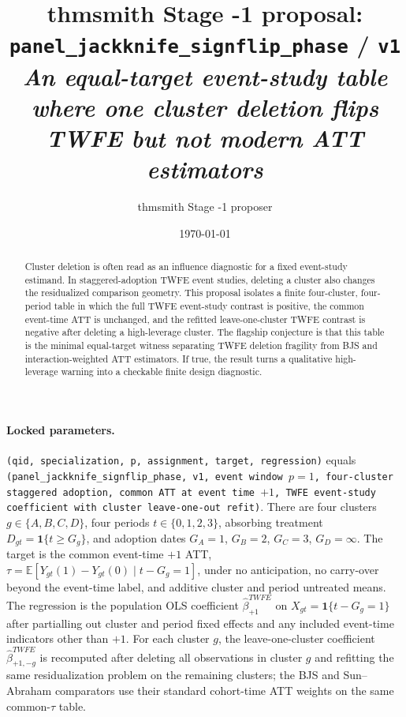 \documentclass[11pt]{article}
\title{thmsmith Stage -1 proposal: \texttt{panel\_jackknife\_signflip\_phase} / \texttt{v1}%
  \\ \large\textit{An equal-target event-study table where one cluster deletion flips TWFE but not modern ATT estimators}}
\author{thmsmith Stage -1 proposer}
\date{\today}
\newcommand{\E}{\mathbb{E}}
\newcommand{\one}{\mathbf{1}}
\theoremstyle{definition}
\theoremstyle{plain}
\theoremstyle{remark}
\begin{document}
\maketitle


\paragraph{Locked parameters.}
\texttt{(qid, specialization, p, assignment, target, regression)}
equals \texttt{(panel\_jackknife\_signflip\_phase, v1, event window \(p=1\), four-cluster staggered adoption, common ATT at event time \(+1\), TWFE event-study coefficient with cluster leave-one-out refit)}.  There are four clusters \(g\in\{A,B,C,D\}\), four periods \(t\in\{0,1,2,3\}\), absorbing treatment \(D_{gt}=\one\{t\ge G_g\}\), and adoption dates \(G_A=1\), \(G_B=2\), \(G_C=3\), \(G_D=\infty\).  The target is the common event-time \(+1\) ATT, \(\tau=\E[Y_{gt}(1)-Y_{gt}(0)\mid t-G_g=1]\), under no anticipation, no carry-over beyond the event-time label, and additive cluster and period untreated means.  The regression is the population OLS coefficient \(\hat\beta^{TWFE}_{+1}\) on \(X_{gt}=\one\{t-G_g=1\}\) after partialling out cluster and period fixed effects and any included event-time indicators other than \(+1\).  For each cluster \(g\), the leave-one-cluster coefficient \(\hat\beta^{TWFE}_{+1,-g}\) is recomputed after deleting all observations in cluster \(g\) and refitting the same residualization problem on the remaining clusters; the BJS and Sun--Abraham comparators use their standard cohort-time ATT weights on the same common-\(\tau\) table.

\begin{abstract}
Cluster deletion is often read as an influence diagnostic for a fixed event-study estimand.  In staggered-adoption TWFE event studies, deleting a cluster also changes the residualized comparison geometry.  This proposal isolates a finite four-cluster, four-period table in which the full TWFE event-study contrast is positive, the common event-time ATT is unchanged, and the refitted leave-one-cluster TWFE contrast is negative after deleting a high-leverage cluster.  The flagship conjecture is that this table is the minimal equal-target witness separating TWFE deletion fragility from BJS and interaction-weighted ATT estimators.  If true, the result turns a qualitative high-leverage warning into a checkable finite design diagnostic.
\end{abstract}
\end{document}
